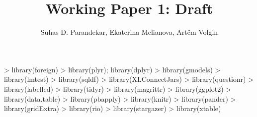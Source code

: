 \documentclass[12pt,a4paper]{article}
\begin{document}


\title{Working Paper 1: Draft}
\author{Suhas D. Parandekar, Ekaterina Melianova, Art\"{e}m Volgin}
\maketitle

\begin{Schunk}
\begin{Sinput}
> library(foreign)
> library(plyr); library(dplyr)
> library(gmodels)
> library(lmtest)
> library(sqldf)
> library(XLConnectJars)
> library(questionr)
> library(labelled)
> library(tidyr)
> library(magrittr)
> library(ggplot2)
> library(data.table)
> library(pbapply)
> library(knitr)
> library(pander)
> library(gridExtra)
> library(rio)
> library(stargazer)
> library(xtable)
\end{Sinput}
\end{Schunk}
\end{document}
